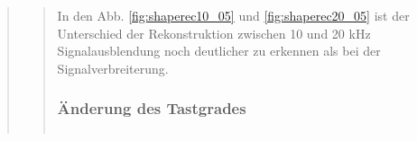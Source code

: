 \begin{quote}
\begin{quote}
        In den Abb. \ref{fig:shaperec10_05} und \ref{fig:shaperec20_05} ist der Unterschied der Rekonstruktion zwischen
        10 und 20 kHz Signalausblendung noch deutlicher zu erkennen als bei der Signalverbreiterung.
        
        
        \subsubsection{Änderung des Tastgrades}
        \begin{quote}
            
             
    
             
             
             
             
             
             \begin{center}
            \begin{tabular}{ll}
            

\end{tabular}
\end{center}
\end{quote}
\end{quote}
\end{quote}
